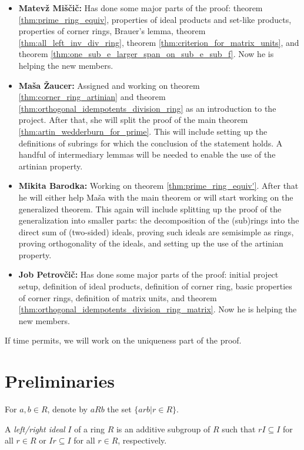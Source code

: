 \begin{itemize}
  \item \textbf{Matevž Miščič: } Has done some major parts of the proof: theorem \ref{thm:prime_ring_equiv}, properties of ideal products and set-like products, properties of corner rings, Brauer's lemma, theorem \ref{thm:all_left_inv_div_ring}, theorem \ref{thm:criterion_for_matrix_units}, and theorem \ref{thm:one_sub_e_larger_span_on_sub_e_sub_f}. Now he is helping the new members.
  \item \textbf{Maša Žaucer: } Assigned and working on theorem \ref{thm:corner_ring_artinian} and theorem \ref{thm:orthogonal_idempotents_division_ring} as an introduction to the project. After that, she will split the proof of the main theorem \ref{thm:artin_wedderburn_for_prime}. This will include setting up the definitions of subrings for which the conclusion of the statement holds. A handful of intermediary lemmas will be needed to enable the use of the artinian property.
  \item \textbf{Mikita Barodka: } Working on theorem \ref{thm:prime_ring_equiv'}. After that he will either help Maša with the main theorem or will start working on the generalized theorem. This again will include splitting up the proof of the generalization into smaller parts: the decomposition of the (sub)rings into the direct sum of (two-sided) ideals, proving such ideals are semisimple as rings, proving orthogonality of the ideals, and setting up the use of the artinian property.
  \item \textbf{Job Petrovčič: } Has done some major parts of the proof: initial project setup, definition of ideal products, definition of corner ring, basic properties of corner rings, definition of matrix units, and theorem \ref{thm:orthogonal_idempotents_division_ring_matrix}. Now he is helping the new members.
\end{itemize}
If time permits, we will work on the uniqueness part of the proof.

\section{Preliminaries}
\begin{definition}
  \label{def:aRb}
  \leanok
  For $a, b \in R$, denote by $aRb$ the set $\{arb| r \in R\}$.
\end{definition}

\begin{definition}
  \label{def:left_right_ideal}
  A \textit{left/right ideal} $I$ of a ring $R$ is an additive subgroup of $R$ such that $rI \subseteq I$ for all $r \in R$ or $Ir \subseteq I$ for all $r \in R$, respectively.
\end{definition}

